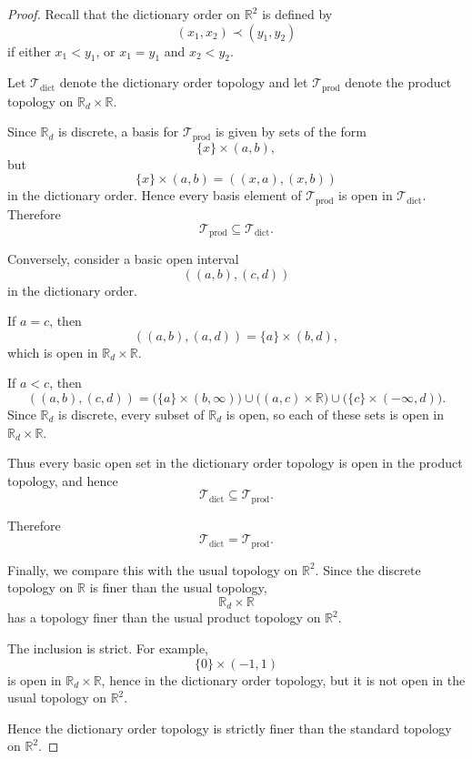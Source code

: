 \begin{proof}
    Recall that the dictionary order on $\mathbb R^2$ is defined by
    \[
        (x_1,x_2)\prec (y_1,y_2)
    \]
    if either $x_1<y_1$, or $x_1=y_1$ and $x_2<y_2$.

    Let $\mathcal T_{\mathrm{dict}}$ denote the dictionary order topology
    and let $\mathcal T_{\mathrm{prod}}$ denote the product topology on
    $\mathbb R_d\times \mathbb R$.

    Since $\mathbb R_d$ is discrete, a basis for
    $\mathcal T_{\mathrm{prod}}$ is given by sets of the form
    \[
        \{x\}\times (a,b),
    \]
    but
    \[
        \{x\}\times(a,b)
        =
        ((x,a),(x,b))
    \]
    in the dictionary order. Hence every basis element of
    $\mathcal T_{\mathrm{prod}}$ is open in
    $\mathcal T_{\mathrm{dict}}$. Therefore
    \[
        \mathcal T_{\mathrm{prod}}
        \subseteq
        \mathcal T_{\mathrm{dict}}.
    \]

    Conversely, consider a basic open interval
    \[
        ((a,b),(c,d))
    \]
    in the dictionary order.

    If $a=c$, then
    \[
        ((a,b),(a,d))
        =
        \{a\}\times(b,d),
    \]
    which is open in $\mathbb R_d\times\mathbb R$.

    If $a<c$, then
    \[
        ((a,b),(c,d))
        =
        \bigl(\{a\}\times(b,\infty)\bigr)
        \cup
        \bigl((a,c)\times\mathbb R\bigr)
        \cup
        \bigl(\{c\}\times(-\infty,d)\bigr).
    \]
    Since $\mathbb R_d$ is discrete, every subset of $\mathbb R_d$
    is open, so each of these sets is open in
    $\mathbb R_d\times\mathbb R$.

    Thus every basic open set in the dictionary order topology is open
    in the product topology, and hence
    \[
        \mathcal T_{\mathrm{dict}}
        \subseteq
        \mathcal T_{\mathrm{prod}}.
    \]

    Therefore
    \[
        \mathcal T_{\mathrm{dict}}
        =
        \mathcal T_{\mathrm{prod}}.
    \]

    Finally, we compare this with the usual topology on $\mathbb R^2$.
    Since the discrete topology on $\mathbb R$ is finer than the usual
    topology,
    \[
        \mathbb R_d\times\mathbb R
    \]
    has a topology finer than the usual product topology on $\mathbb R^2$.

    The inclusion is strict. For example,
    \[
        \{0\}\times(-1,1)
    \]
    is open in $\mathbb R_d\times\mathbb R$, hence in the dictionary
    order topology, but it is not open in the usual topology on
    $\mathbb R^2$.

    Hence the dictionary order topology is strictly finer than the
    standard topology on $\mathbb R^2$.
\end{proof}



